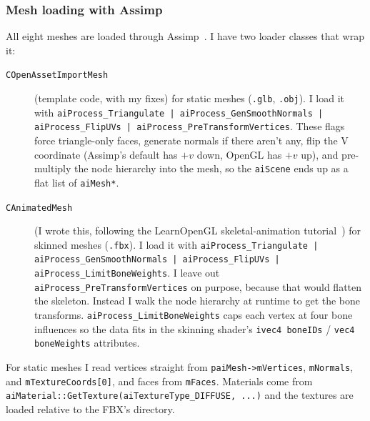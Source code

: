 \documentclass[11pt,a4paper]{article}
\begin{document}
\subsubsection*{Mesh loading with Assimp}

All eight meshes are loaded through Assimp~\cite{assimp}. I have two loader
classes that wrap it:

\begin{description}
  \item[\texttt{COpenAssetImportMesh}] (template code, with my fixes) for
        static meshes (\texttt{.glb}, \texttt{.obj}). I load it with
        \texttt{aiProcess\_Triangulate | aiProcess\_GenSmoothNormals |
        aiProcess\_FlipUVs | aiProcess\_PreTransformVertices}. These flags
        force triangle-only faces, generate normals if there aren't any,
        flip the V coordinate (Assimp's default has $+v$ down, OpenGL has
        $+v$ up), and pre-multiply the node hierarchy into the mesh, so
        the \texttt{aiScene} ends up as a flat list of \texttt{aiMesh*}.
  \item[\texttt{CAnimatedMesh}] (I wrote this, following the LearnOpenGL
        skeletal-animation tutorial~\cite{learnopengl_skeletal}) for skinned
        meshes (\texttt{.fbx}). I load it with
        \texttt{aiProcess\_Triangulate | aiProcess\_GenSmoothNormals |
        aiProcess\_FlipUVs | aiProcess\_LimitBoneWeights}. I leave out
        \texttt{aiProcess\_PreTransformVertices} on purpose, because that
        would flatten the skeleton. Instead I walk the node hierarchy at
        runtime to get the bone transforms.
        \texttt{aiProcess\_LimitBoneWeights} caps each vertex at four bone
        influences so the data fits in the skinning shader's
        \texttt{ivec4 boneIDs} / \texttt{vec4 boneWeights} attributes.
\end{description}

For static meshes I read vertices straight from
\texttt{paiMesh->mVertices}, \texttt{mNormals}, and
\texttt{mTextureCoords[0]}, and faces from \texttt{mFaces}. Materials come
from \texttt{aiMaterial::GetTexture(aiTextureType\_DIFFUSE, ...)} and the
textures are loaded relative to the FBX's directory.
\end{document}
